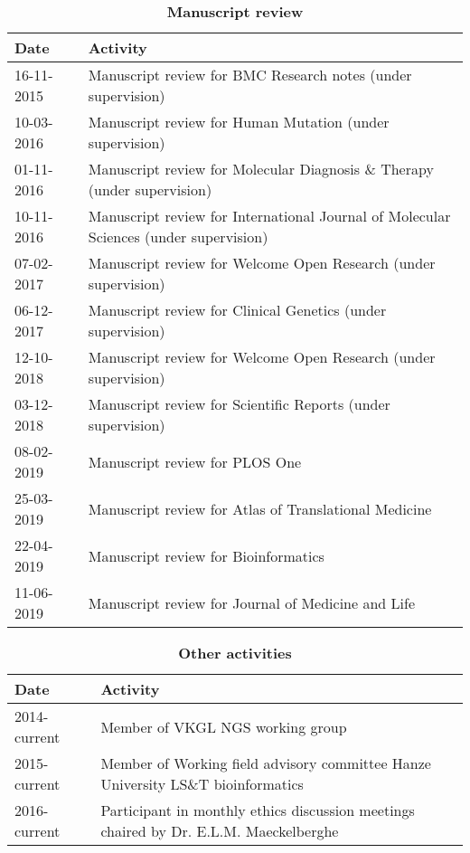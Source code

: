 \begin{appendices}
	\begin{table}
		\caption*{\textbf{Manuscript review}}
		\footnotesize
		\begin{tabulary}{\linewidth}{LL}
			Date & Activity \\
			\hline
			\rule{0pt}{2.6ex}\mbox{16-11-2015 } & Manuscript review for BMC Research notes (under supervision)\\
			\rule{0pt}{2.6ex}\mbox{10-03-2016 } & Manuscript review for Human Mutation (under supervision)\\
			\rule{0pt}{2.6ex}\mbox{01-11-2016 } & Manuscript review for Molecular Diagnosis \& Therapy (under supervision)\\
			\rule{0pt}{2.6ex}\mbox{10-11-2016 } & Manuscript review for International Journal of Molecular Sciences (under supervision)\\
			\rule{0pt}{2.6ex}\mbox{07-02-2017 } & Manuscript review for Welcome Open Research (under supervision)\\
			\rule{0pt}{2.6ex}\mbox{06-12-2017 } & Manuscript review for Clinical Genetics (under supervision)\\
			\rule{0pt}{2.6ex}\mbox{12-10-2018 } & Manuscript review for Welcome Open Research (under supervision)\\
			\rule{0pt}{2.6ex}\mbox{03-12-2018 } & Manuscript review for Scientific Reports (under supervision)\\
			\rule{0pt}{2.6ex}\mbox{08-02-2019 } & Manuscript review for PLOS One\\
			\rule{0pt}{2.6ex}\mbox{25-03-2019 } & Manuscript review for Atlas of Translational Medicine\\
			\rule{0pt}{2.6ex}\mbox{22-04-2019 } & Manuscript review for Bioinformatics \\
			\rule{0pt}{2.6ex}\mbox{11-06-2019 } & Manuscript review for Journal of Medicine and Life\\
			\hline
		\end{tabulary}
		\label{table:appendix_activities_5}
		\end{table}
			
			
	\begin{table}
		\caption*{\textbf{Other activities}}
		\footnotesize
		\begin{tabulary}{\linewidth}{LL}
			Date & Activity \\
			\hline	
			\rule{0pt}{2.6ex}\mbox{2014-current } & Member of VKGL NGS working group \\
			\rule{0pt}{2.6ex}\mbox{2015-current } & Member of Working field advisory committee Hanze University LS\&T bioinformatics \\
			\rule{0pt}{2.6ex}\mbox{2016-current } & Participant in monthly ethics discussion meetings chaired by Dr. E.L.M. Maeckelberghe \\
			\hline
		\end{tabulary}
		\label{table:appendix_activities_6}
	\end{table}


\end{appendices}
